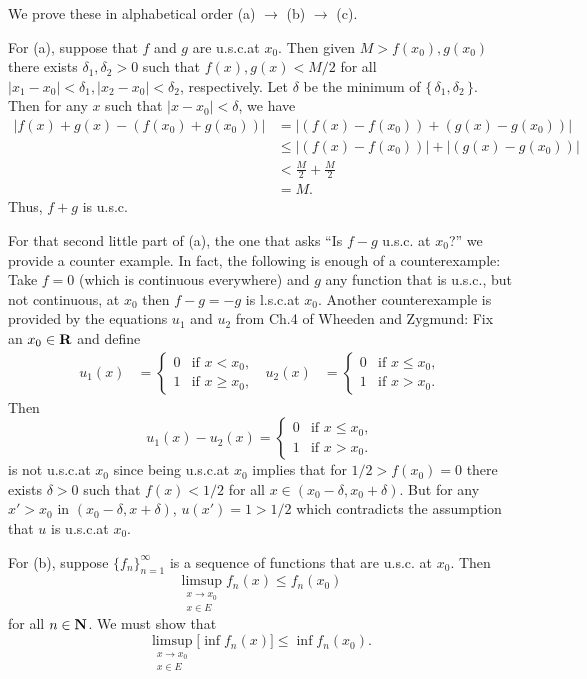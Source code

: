 \begin{solution}
  We prove these in alphabetical order (a) $\to$ (b) $\to$ (c).

  For (a), suppose that $f$ and $g$ are u.s.c.\@ at $x_0$. Then given
  $M>f(x_0),g(x_0)$ there exists $\delta_1,\delta_2>0$ such that
  $f(x),g(x)<M/2$ for all $|x_1-x_0|<\delta_1,|x_2-x_0|<\delta_2$,
  respectively. Let $\delta$ be the minimum of
  $\{\,\delta_1,\delta_2\,\}$. Then for any $x$ such that $|x-x_0|<\delta$,
  we have
  \begin{align*}
    |f(x)+g(x)-(f(x_0)+g(x_0))|
    &=|(f(x)-f(x_0))+(g(x)-g(x_0))|\\
    &\leq |(f(x)-f(x_0))|+|(g(x)-g(x_0))|\\
    &<\frac{M}{2}+\frac{M}{2}\\
    &=M.
  \end{align*}
  Thus, $f+g$ is u.s.c.

  For that second little part of (a), the one that asks ``Is $f-g$ u.s.c.\@
  at $x_0$?'' we provide a counter example. In fact, the following is enough of a
  counterexample: Take $f=0$ (which is continuous everywhere) and $g$ any
  function that is u.s.c.\@, but not continuous, at $x_0$ then $f-g=-g$ is
  l.s.c.\@ at $x_0$. Another counterexample is provided by the equations
  $u_1$ and $u_2$ from Ch.\@ 4 of Wheeden and Zygmund: Fix an $x_0\in\mathbf{R}$
  and define
  \begin{align*}
    u_1(x)&=\begin{cases}
      0&\text{if $x<x_0$,}\\
      1&\text{if $x\geq x_0$,}
    \end{cases}
    &
    u_2(x)&=\begin{cases}
      0&\text{if $x\leq x_0$,}\\
      1&\text{if $x>x_0$.}
    \end{cases}
  \end{align*}
  Then
  \[
    u_1(x)-u_2(x)=
    \begin{cases}
      0&\text{if $x\leq x_0$,}\\
      1&\text{if $x>x_0$.}
    \end{cases}
  \]
  is not u.s.c.\@ at $x_0$ since being u.s.c.\@ at $x_0$ implies that for
  $1/2>f(x_0)=0$ there exists $\delta>0$ such that $f(x)<1/2$ for all
  $x\in (x_0-\delta,x_0+\delta)$. But for any $x'>x_0$ in
  $(x_0-\delta,x+\delta)$, $u(x')=1>1/2$ which contradicts the assumption
  that $u$ is u.s.c.\@ at $x_0$.

  For (b), suppose $\{f_n\}_{n=1}^\infty$ is a sequence of functions that are u.s.c.\@
  at $x_0$. Then
  \[
    \limsup_{\substack{x\to x_0\\ x\in E}}f_n(x)\leq f_n(x_0)
  \]
  for all $n\in\mathbf{N}$. We must show that
  \[
    \limsup_{\substack{x\to x_0\\ x\in E}}\bigl[\inf f_n(x)\bigr]\leq \inf
    f_n(x_0).
  \]
\end{solution}

